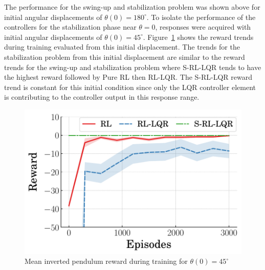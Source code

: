 The performance for the swing-up and stabilization problem was shown above for initial angular displacements of $\theta(0)=180^{\circ}$.
To isolate the performance of the controllers for the stabilization phase near $\theta=0$, responses were acquired with initial angular displacements of $\theta(0)=45^\circ$.
Figure~\ref{fig_chap2:invpend_near_reward_trend} shows the reward trends during training evaluated from this initial displacement. The trends for the stabilization problem from this initial displacement are similar to the reward trends for the swing-up and stabilization problem where S-RL-LQR tends to have the highest reward followed by Pure RL then RL-LQR. The S-RL-LQR reward trend is constant for this initial condition since only the LQR controller element is contributing to the controller output in this response range.
%
\begin{figure}[t]
    \vspace{-0.2in}
    \centering
    \includegraphics[scale=0.65]{figures/figures_RL_model_based_control/invpend_near_mean_reward_v_episode}
    \caption{Mean inverted pendulum reward during training for $\theta(0)=45^{\circ}$}
    \label{fig_chap2:invpend_near_reward_trend}
\end{figure}
%
%
